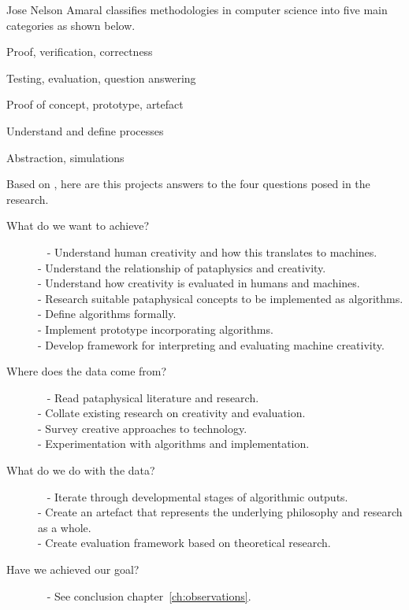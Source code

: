 \documentclass[11pt]{thesis} %
\begin{document}
Jose Nelson Amaral \citeyear{Amaral} classifies methodologies in computer science into five main categories as shown below.

\begin{description}[leftmargin=3.5cm]
  \item [Formal] Proof, verification, correctness
  \item [Experimental] Testing, evaluation, question answering
  \item [Build] Proof of concept, prototype, artefact
  \item [Process] Understand and define processes
  \item [Model] Abstraction, simulations
\end{description}

\spirals

Based on \autocite{Holz2006}, here are this projects answers to the four questions posed in the research.

\begin{description}
  \item[What do we want to achieve?]~
    - Understand human creativity and how this translates to machines.\\
    - Understand the relationship of pataphysics and creativity.\\
    - Understand how creativity is evaluated in humans and machines.\\
    - Research suitable pataphysical concepts to be implemented as algorithms.\\ 
    - Define algorithms formally.\\
    - Implement prototype incorporating algorithms.\\
    - Develop framework for interpreting and evaluating machine creativity.
	\item[Where does the data come from?]~
    - Read pataphysical literature and research.\\
    - Collate existing research on creativity and evaluation.\\
    - Survey creative approaches to technology.\\
    - Experimentation with algorithms and implementation.
	\item[What do we do with the data?]~
    - Iterate through developmental stages of algorithmic outputs.\\
    - Create an artefact that represents the underlying philosophy and research as a whole.\\
    - Create evaluation framework based on theoretical research.
  \item[Have we achieved our goal?]~
    - See conclusion chapter~\ref{ch:observations}.
\end{description}
\end{document}
